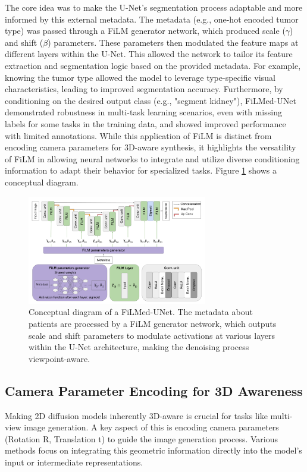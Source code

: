 The core idea was to make the U-Net's segmentation process adaptable and more informed by this external metadata. The metadata (e.g., one-hot encoded tumor type) was passed through a FiLM generator network, which produced scale ($\gamma$) and shift ($\beta$) parameters. These parameters then modulated the feature maps at different layers within the U-Net. This allowed the network to tailor its feature extraction and segmentation logic based on the provided metadata. For example, knowing the tumor type allowed the model to leverage type-specific visual characteristics, leading to improved segmentation accuracy. Furthermore, by conditioning on the desired output class (e.g., "segment kidney"), FiLMed-UNet demonstrated robustness in multi-task learning scenarios, even with missing labels for some tasks in the training data, and showed improved performance with limited annotations. While this application of FiLM is distinct from encoding camera parameters for 3D-aware synthesis, it highlights the versatility of FiLM in allowing neural networks to integrate and utilize diverse conditioning information to adapt their behavior for specialized tasks. Figure \ref{fig:filmed-unet-concept} shows a conceptual diagram.

\begin{figure}[h]
  \centering
  \includegraphics[width=0.7\textwidth]{images/related-work/filmed-unet.png}
  \caption{Conceptual diagram of a FiLMed-UNet. The metadata about patients are processed by a FiLM generator network, which outputs scale and shift parameters to modulate activations at various layers within the U-Net architecture, making the denoising process viewpoint-aware.}
  \label{fig:filmed-unet-concept}

\end{figure}

\subsection{Camera Parameter Encoding for 3D Awareness}\label{ssec:camera_param_encoding}
Making 2D diffusion models inherently 3D-aware is crucial for tasks like multi-view image generation. A key aspect of this is encoding camera parameters (Rotation R, Translation t) to guide the image generation process. Various methods focus on integrating this geometric information directly into the model's input or intermediate representations.


